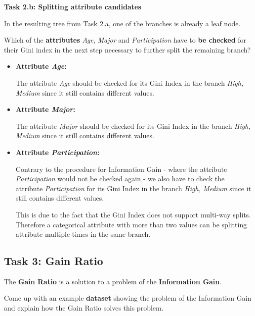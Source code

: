 \documentclass[
english,
smallborders
]{i6prcsht}
\begin{document}
\textbf{Task 2.b: Splitting attribute candidates}

In the resulting tree from Task 2.a, one of the branches is already a leaf node.

Which of the \textbf{attributes} \textit{Age}, \textit{Major} and \textit{Participation} have to \textbf{be checked} for their Gini index in the next step necessary to further split the remaining branch?

\begin{solution}
	\begin{itemize}
		\item \textbf{Attribute \textit{Age}:}
		      
		      The attribute \textit{Age} should be checked for its Gini Index in the branch \textit{High, Medium} since it still contains different values.
		      
		\item \textbf{Attribute \textit{Major}:}
		      
		      The attribute \textit{Major} should be checked for its Gini Index in the branch \textit{High, Medium} since it still contains different values.
		      
		\item \textbf{Attribute \textit{Participation}:}
		      
		      Contrary to the procedure for Information Gain - where the attribute \textit{Participation} would not be checked again - we also have to check the attribute \textit{Participation} for its Gini Index in the branch \textit{High, Medium} since it still contains different values.
		      
		      This is due to the fact that the Gini Index does not support multi-way splits. Therefore a categorical attribute with more than two values can be splitting attribute multiple times in the same branch.
		      
		      
	\end{itemize}
\end{solution}

\subsection*{Task 3: Gain Ratio}

The \textbf{Gain Ratio} is a solution to a problem of the \textbf{Information Gain}.

Come up with an example \textbf{dataset} showing the problem of the Information Gain and explain how the Gain Ratio solves this problem.
\end{document}

